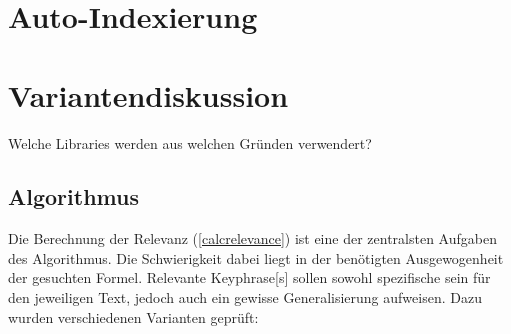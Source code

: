 \section{Auto-Indexierung}


\section{Variantendiskussion}

Welche Libraries werden aus welchen Gründen verwendert?

\subsection{Algorithmus}

Die Berechnung der Relevanz (\autoref{calcrelevance}) ist eine der zentralsten Aufgaben des Algorithmus. Die Schwierigkeit dabei liegt in der benötigten Ausgewogenheit der gesuchten Formel. Relevante \gls{Keyphrase}[s] sollen sowohl spezifische sein für den jeweiligen Text, jedoch auch ein gewisse Generalisierung aufweisen.  Dazu wurden verschiedenen Varianten geprüft:

